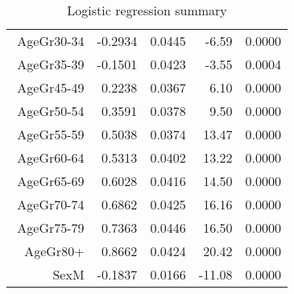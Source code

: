 \begin{table}[ht]
\begin{tabular}{rrrrr}
$$  AgeGr30-34 & -0.2934 & 0.0445 & -6.59 & 0.0000 \\ 
  AgeGr35-39 & -0.1501 & 0.0423 & -3.55 & 0.0004 \\ 
  AgeGr45-49 & 0.2238 & 0.0367 & 6.10 & 0.0000 \\ 
  AgeGr50-54 & 0.3591 & 0.0378 & 9.50 & 0.0000 \\ 
  AgeGr55-59 & 0.5038 & 0.0374 & 13.47 & 0.0000 \\ 
  AgeGr60-64 & 0.5313 & 0.0402 & 13.22 & 0.0000 \\ 
  AgeGr65-69 & 0.6028 & 0.0416 & 14.50 & 0.0000 \\ 
  AgeGr70-74 & 0.6862 & 0.0425 & 16.16 & 0.0000 \\ 
  AgeGr75-79 & 0.7363 & 0.0446 & 16.50 & 0.0000 \\ 
  AgeGr80+ & 0.8662 & 0.0424 & 20.42 & 0.0000 \\ 
  SexM & -0.1837 & 0.0166 & -11.08 & 0.0000 \\ 
   \hline
\end{tabular}
\caption{Logistic regression summary} 
\end{table}
